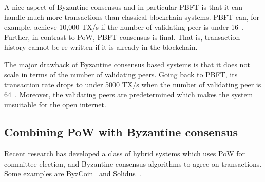 A nice aspect of Byzantine consensus and in particular PBFT is that it can handle much more transactions than classical blockchain systems.
PBFT can, for example, achieve 10,000 TX/s if the number of validating peer is under 16~\cite[Section 5.2]{miller2016honey}.
Further, in contrast to PoW, PBFT consensus is final.
That is, transaction history cannot be re-written if it is already in the blockchain.

The major drawback of Byzantine consensus based systems is that it does not scale in terms of the number of validating peers.
Going back to PBFT, its transaction rate drops to under 5000 TX/s when the number of validating peer is 64~\cite[Section 5.2]{miller2016honey}.
Moreover, the validating peers are predetermined which makes the system unsuitable for the open internet.



\subsection{Combining PoW with Byzantine consensus}
Recent research has developed a class of hybrid systems which uses PoW for committee election,
and Byzantine consensus algorithms to agree on transactions.
Some examples are ByzCoin~\cite{kogias2016enhancing} and Solidus~\cite{abraham2016solidus}.

